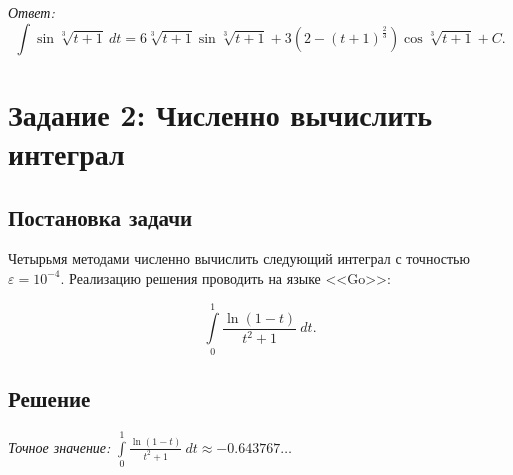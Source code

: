 \documentclass[14pt, a4paper, titlepage, fleqn]{extarticle}
\begin{document}
        \textit{Ответ:} 
        \[
            \displaystyle
            \int \sin{ \sqrt[3]{t+1} } ~ dt
            = 6 \sqrt[3]{t+1} \sin{\sqrt[3]{t+1}}
            + 3\left( 2 - (t+1)^{\frac{2}{3}} \right) \cos{\sqrt[3]{t+1}} + C.
        \]

    \pagebreak

    \section{Задание 2: Численно вычислить интеграл}
        \subsection{Постановка задачи}
            Четырьмя методами численно вычислить следующий интеграл
            с точностью \( \varepsilon = 10^{-4} \).
            Реализацию решения проводить на языке <<Go>>:
            
            \[ \int\limits_0^1 \frac{\ln(1-t)}{t^2+1} ~ dt. \]

        \subsection{Решение}
            \textit{Точное значение:}
            \( 
                \displaystyle
                \int\limits_0^1 \frac{\ln(1-t)}{t^2+1} ~ dt \approx -0.643767\dots
            \)
\end{document}
